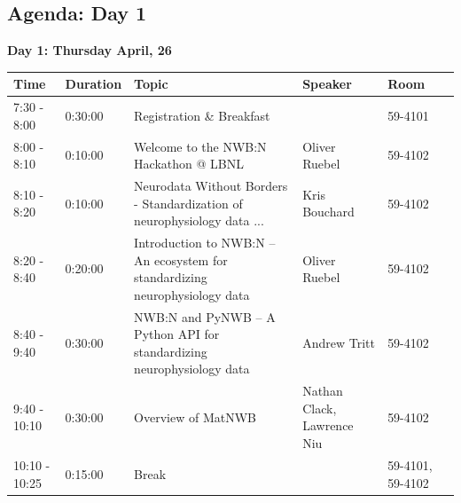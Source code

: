 \documentclass{article}
\begin{document}
\subsection{Agenda: Day 1}
\vspace{-0.1cm}
\textbf{Day 1: Thursday April, 26}
\vspace{-0.2cm}
\begin{table}[h!]
\small
\centering
\label{tab:program:day1}
\begin{tabular}{|l|l|p{6cm}|p{2cm}|p{1.5cm}|l|}
\hline
\textbf{Time}       & \textbf{Duration} & \textbf{Topic}                                                                               & \textbf{Speaker}         & \textbf{Room}                               & \textbf{}           \\ \hline \hline
7:30 - 8:00       & 0:30:00           & Registration \& Breakfast                                                                      &                          & 59-4101                                     & \cellcolor{gray!25}  \\ \hline
8:00 - 8:10       & 0:10:00           & Welcome to the NWB:N Hackathon @ LBNL                                                          & Oliver Ruebel            & 59-4102                                     & \cellcolor{blue!} \\ \hline
8:10 - 8:20       & 0:10:00           & Neurodata Without Borders - Standardization of neurophysiology data ...                        & Kris Bouchard            & 59-4102                                     & \cellcolor{blue!} \\ \hline
8:20 - 8:40       & 0:20:00           & Introduction to NWB:N – An ecosystem for standardizing neurophysiology data                    & Oliver Ruebel            & 59-4102                                     & \cellcolor{blue!} \\ \hline
8:40 - 9:40       & 0:30:00           & NWB:N and PyNWB – A Python API for standardizing neurophysiology data                          & Andrew Tritt             & 59-4102                                     & \cellcolor{blue!} \\ \hline
9:40 - 10:10      & 0:30:00           & Overview of MatNWB                                                                             & Nathan Clack, Lawrence Niu   & 59-4102                                 & \cellcolor{blue!} \\ \hline
10:10 - 10:25     & 0:15:00           & Break                                                                                          &                          & 59-4101, 59-4102                            & \cellcolor{gray!25} \\ \hline

\end{tabular}
\end{table}
\end{document}
